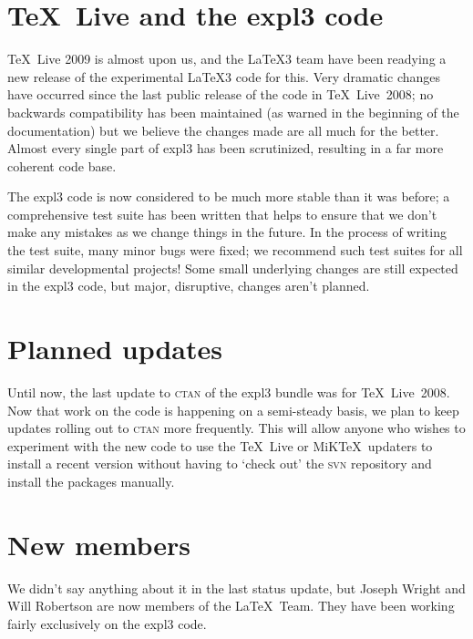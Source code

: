 \documentclass{ltnews}
\begin{document}
\maketitle

\section{\TeX~Live and the \textsf{expl3} code}

\TeX~Live 2009 is almost upon us, and the \LaTeX3 team have been
readying a new release of the experimental \LaTeX3 code for this.
Very dramatic changes have occurred since the
last public release of the code in \TeX~Live~2008; no backwards compatibility has been
maintained (as warned in the beginning of the documentation) but we
believe the changes made are all much for the better. Almost every
single part of \textsf{expl3} has been scrutinized, resulting in a far
more coherent code base.

The \textsf{expl3} code is now considered to be much more stable than
it was before; a comprehensive test suite has been written that helps
to ensure that we don't make any mistakes as we change things in the
future. In the process of writing the test
suite, many minor bugs were fixed; we recommend such test suites for
all similar developmental projects!
Some small underlying changes are still expected in the
\textsf{expl3} code, but major, disruptive, changes aren't planned.

\section{Planned updates}

Until now, the last update to \textsc{ctan} of the \textsf{expl3}
bundle was for \TeX~Live~2008. Now that work on the code is happening
on a semi-steady basis, we plan to keep updates rolling out to
\textsc{ctan} more frequently. This will allow anyone who wishes to
experiment with the new code to use the \TeX~Live or MiK\TeX\ 
updaters to install a recent version without having to `check out' the
\textsc{svn} repository and install the packages manually.

\section{New members}

We didn't say anything about it in the last status update, but Joseph
Wright and Will Robertson are now members of the \LaTeX\ Team. They
have been working fairly exclusively on the \textsf{expl3} code. 
\end{document}
